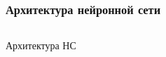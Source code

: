 \begin{frame}
\frametitle{Архитектура нейронной сети}
\begin{columns}[T]
    
    \begin{block}{\centering Архитектура НС}
        \vspace{1mm}
        \centering
    \end{block}        

    \vspace{-2mm}
        
\end{columns}
\end{frame}
